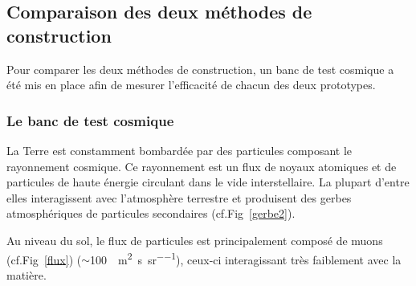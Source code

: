  \subsection{Comparaison des deux méthodes de construction}
 
 Pour comparer les deux méthodes de construction, un banc de test cosmique a été mis en place afin de mesurer l'efficacité de chacun des deux prototypes.
 
 \subsubsection{Le banc de test cosmique}
 \label{banc}
 La Terre est constamment bombardée par des particules composant le rayonnement cosmique. Ce rayonnement est un flux de noyaux atomiques et de particules de haute énergie circulant dans le vide interstellaire. La plupart d'entre elles interagissent avec l'atmosphère terrestre et produisent des gerbes atmosphériques de particules secondaires (cf.Fig~\ref{gerbe2}).
 
 Au niveau du sol, le flux de particules est principalement composé de muons (cf.Fig~\ref{flux}) ($\sim$\SI{100}{\per\square\meter\per\second\per\steradian}), ceux-ci interagissant très faiblement avec la matière.
 
